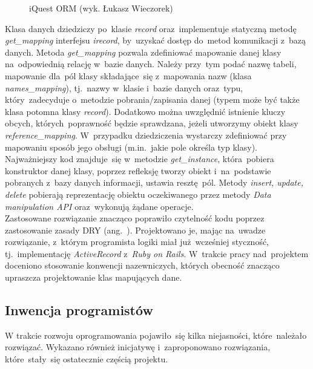 \newpage
\begin{figure}[H]
\begin{center}
 
\end{center}
\caption{iQuest ORM (wyk. Łukasz Wieczorek)}\label{fig:iquest-orm}
\end{figure}
\newpage

Klasa danych dziedziczy po~klasie \textit{record} oraz~implementuje statyczną metodę \textit{get\_mapping} interfejsu \textit{irecord}, by~uzyskać dostęp do~metod komunikacji z~bazą danych. Metoda \textit{get\_mapping} pozwala zdefiniować mapowanie danej klasy na~odpowiednią relację w~bazie danych. Należy przy~tym podać nazwę tabeli, mapowanie dla~pól klasy składające~się z~mapowania nazw (klasa \textit{names\_mapping}), tj.~nazwy w~klasie i~bazie danych oraz~typu, który~zadecyduje o~metodzie pobrania\slash zapisania danej (typem może być także klasa potomna klasy \textit{record}). Dodatkowo można uwzględnić istnienie kluczy obcych, których~poprawność będzie sprawdzana, jeżeli utworzymy obiekt klasy \textit{reference\_mapping}. W~przypadku dziedziczenia wystarczy zdefiniować przy mapowaniu sposób jego obsługi (m.in.~jakie pole określa typ klasy). Najważniejszy kod znajduje~się w~metodzie \textit{get\_instance}, która~pobiera konstruktor danej klasy, poprzez refleksję tworzy obiekt i~na~podstawie pobranych z~bazy danych informacji, ustawia resztę~pól. Metody \textit{insert, update, delete} pobierają reprezentację obiektu oczekiwanego przez metody \textit{Data manipulation API} oraz~wykonują żądane operacje.\\

Zastosowane rozwiązanie znacząco poprawiło czytelność kodu poprzez zastosowanie zasady DRY (ang.~). Projektowano je, mając na~uwadze rozwiązanie, z~którym programista logiki miał już~wcześniej styczność, tj.~implementację \textit{ActiveRecord} z~\textit{Ruby on Rails}. W~trakcie pracy nad~projektem doceniono stosowanie konwencji nazewniczych, których obecność znacząco upraszcza projektowanie klas mapujących dane.

\subsection{Inwencja programistów}
\label{Chapter62d}

W trakcie rozwoju oprogramowania pojawiło~się kilka niejasności, które~należało rozwiązać. Wykazano również inicjatywę i~zaproponowano rozwiązania, które~stały~się ostatecznie częścią projektu. \\

